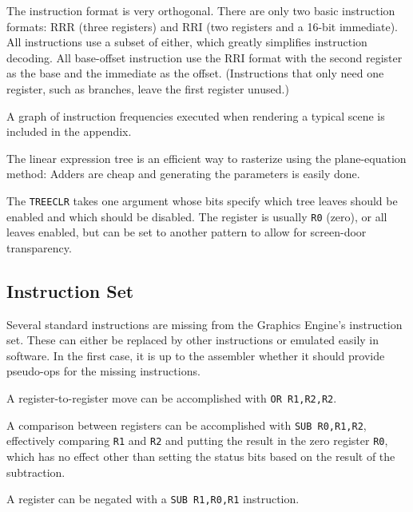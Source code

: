 \documentclass{book}
\begin{document}
The instruction format is very orthogonal.  There are only two basic
instruction formats: RRR (three registers) and RRI (two registers and a
16-bit immediate).  All instructions use a subset of either, which
greatly simplifies instruction decoding.  All base-offset instruction
use the RRI format with the second register as the base and the
immediate as the offset.  (Instructions that only need one register,
such as branches, leave the first register unused.)

A graph of instruction frequencies executed when rendering a typical
scene is included in the appendix.



The linear expression tree is an efficient way to rasterize using the
plane-equation method: Adders are cheap and generating the parameters
is easily done.

The {\tt TREECLR} takes one argument whose bits specify which tree
leaves should be enabled and which should be disabled.  The register
is usually {\tt R0} (zero), or all leaves enabled, but can be set
to another pattern to allow for
screen-door transparency.


\subsection{Instruction Set}

Several standard instructions are missing from the Graphics Engine's
instruction set.  These can either be replaced by other instructions
or emulated easily in software.  In the first case, it is up to the
assembler whether it should provide pseudo-ops for the missing instructions.

\vspace{1ex}\quad A
register-to-register move can be accomplished with {\tt OR R1,R2,R2}.

\vspace{1ex}\quad A comparison
between registers can be accomplished with {\tt SUB R0,R1,R2},
effectively comparing {\tt R1} and {\tt R2} and putting the result in
the zero register {\tt R0}, which has no effect other than setting the
status bits based on the result of the subtraction.

\vspace{1ex}\quad A register can be
negated with a {\tt SUB R1,R0,R1} instruction.
\end{document}
